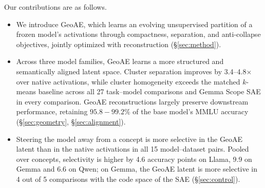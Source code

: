 \documentclass[11pt]{article}
\begin{document}
Our contributions are as follows.
\begin{itemize}
    \item 
    We introduce GeoAE, which learns an evolving unsupervised partition of a frozen model's activations through compactness, separation, and anti-collapse objectives, jointly optimized with reconstruction (\S\ref{sec:method}).



\item Across three model families, GeoAE learns a more structured and semantically aligned latent space. Cluster separation improves by 3.4--4.8$\times$ over native activations, while cluster homogeneity exceeds the matched $k$-means baseline across all 27 task--model comparisons and Gemma Scope SAE in every comparison. GeoAE reconstructions largely preserve downstream performance, retaining $95.8-99.2\%$ of the base model's MMLU accuracy (\S\ref{sec:geometry}, \S\ref{sec:alignment}).


    \item Steering the model away from a concept is more selective in the GeoAE latent than in the native activations in all 15 model--dataset pairs. Pooled over concepts, selectivity is higher by 4.6 accuracy points on Llama, 9.9 on Gemma and 6.6 on Qwen; on Gemma, the GeoAE latent is more selective in 4 out of 5 comparisons with the code space of the SAE (\S\ref{sec:control}).
\end{itemize}
\end{document}
